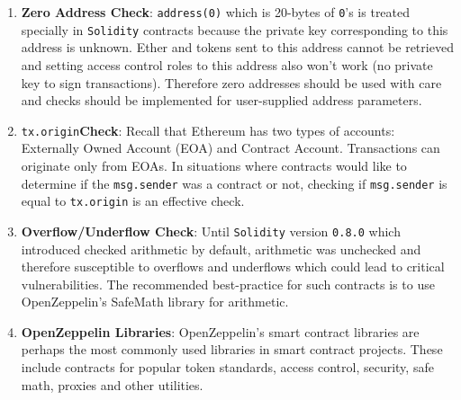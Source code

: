 \begin{enumerate}
\item\textbf{Zero Address Check}: \verb|address(0)| which is 20-bytes of \verb|0|’s is treated specially in \verb|Solidity| contracts because the private key corresponding to this address is unknown. Ether and tokens sent to this address cannot be retrieved and setting access control roles to this address also won’t work (no private key to sign transactions). Therefore zero addresses should be used with care and checks should be implemented for user-supplied address parameters.

\item\verb|tx.origin|\textbf{Check}: Recall that Ethereum has two types of accounts: Externally Owned Account (EOA) and Contract Account. Transactions can originate only from EOAs. In situations where contracts would like to determine if the \verb|msg.sender| was a contract or not, checking if \verb|msg.sender| is equal to \verb|tx.origin| is an effective check.

\item\textbf{Overflow/Underflow Check}: Until \verb|Solidity| version \verb|0.8.0| which introduced checked arithmetic by default, arithmetic was unchecked and therefore susceptible to overflows and underflows which could lead to critical vulnerabilities. The recommended best-practice for such contracts is to use OpenZeppelin’s SafeMath library for arithmetic.

\item\textbf{OpenZeppelin Libraries}: OpenZeppelin’s smart contract libraries are perhaps the most commonly used libraries in smart contract projects. These include contracts for popular token standards, access control, security, safe math, proxies and other utilities.


\end{enumerate}
